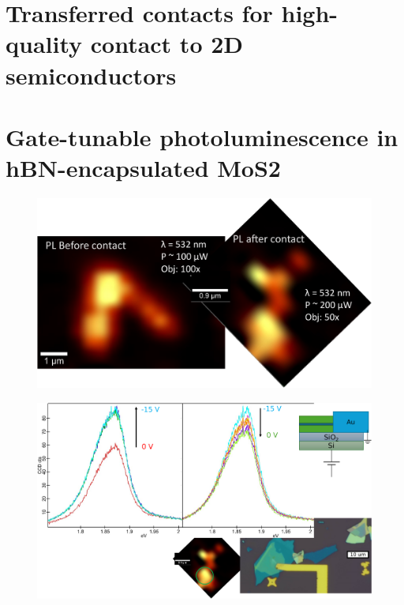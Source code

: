 \documentclass[double,12pt,1in]{beavtex}
\begin{document}
\chapter{Transferred contacts for high-quality contact to 2D semiconductors}

\chapter{Gate-tunable photoluminescence in hBN-encapsulated MoS2}

\begin{figure}
    \includegraphics[width=1\textwidth]{PL before-after contact.pdf}
    \caption{}
\end{figure}

\begin{figure}
    \includegraphics[width=1\textwidth]{First Vg PL sweeps.pdf}
    \caption{}
\end{figure}
\end{document}
